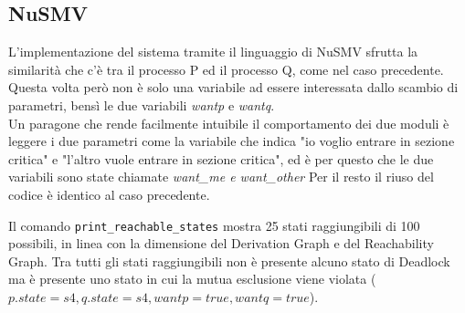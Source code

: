 \documentclass[a4paper]{article}
\begin{document}
\subsection{NuSMV}
L'implementazione del sistema tramite il linguaggio di NuSMV sfrutta la similarità che c'è tra il processo P ed il processo Q, come nel caso precedente.
Questa volta però non è solo una variabile ad essere interessata dallo scambio di parametri, bensì le due variabili \textit{wantp} e \textit{wantq}.\\
Un paragone che rende facilmente intuibile il comportamento dei due moduli è leggere i due parametri come la variabile che indica "io voglio entrare in sezione critica" e "l'altro vuole entrare in sezione critica", ed è per questo che le due variabili sono state chiamate \textit{want\_me \textit{e} want\_other}
Per il resto il riuso del codice è identico al caso precedente.

Il comando \texttt{print\_reachable\_states} mostra 25 stati raggiungibili di 100 possibili, in linea con la dimensione del Derivation Graph e del Reachability Graph.
Tra tutti gli stati raggiungibili non è presente alcuno stato di Deadlock ma è presente uno stato in cui la mutua esclusione viene violata ($p.state=s4,q.state=s4,wantp=true,wantq=true$).
\end{document}
